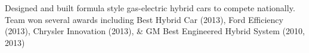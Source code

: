 \documentclass[]{deedy-resume}
\begin{document}
\begin{minipage}[t]{0.66\textwidth}
Designed and built formula style gas-electric hybrid cars to compete nationally. Team won several awards including Best Hybrid Car (2013), Ford Efficiency (2013), Chrysler Innovation (2013), \& GM Best Engineered Hybrid System (2010, 2013)
\sectionsep

\end{minipage}
\end{document}
